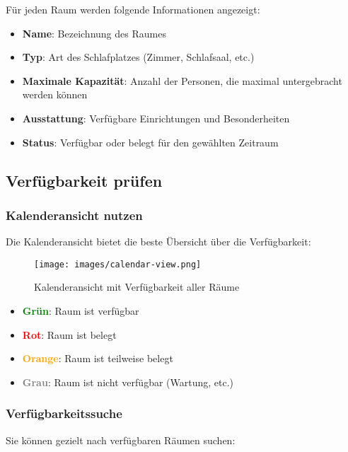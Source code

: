 Für jeden Raum werden folgende Informationen angezeigt:

\begin{itemize}
    \item \textbf{Name}: Bezeichnung des Raumes
    \item \textbf{Typ}: Art des Schlafplatzes (Zimmer, Schlafsaal, etc.)
    \item \textbf{Maximale Kapazität}: Anzahl der Personen, die maximal untergebracht werden können
    \item \textbf{Ausstattung}: Verfügbare Einrichtungen und Besonderheiten
    \item \textbf{Status}: Verfügbar oder belegt für den gewählten Zeitraum
\end{itemize}

\subsection{Verfügbarkeit prüfen}

\subsubsection{Kalenderansicht nutzen}

Die Kalenderansicht bietet die beste Übersicht über die Verfügbarkeit:

\begin{figure}[H]
    \centering
    \texttt{[image: images/calendar-view.png]}
    \caption{Kalenderansicht mit Verfügbarkeit aller Räume}
    \label{fig:calendar}
\end{figure}

\begin{itemize}
    \item \textcolor{green}{\textbf{Grün}}: Raum ist verfügbar
    \item \textcolor{red}{\textbf{Rot}}: Raum ist belegt
    \item \textcolor{orange}{\textbf{Orange}}: Raum ist teilweise belegt
    \item \textcolor{gray}{\textbf{Grau}}: Raum ist nicht verfügbar (Wartung, etc.)
\end{itemize}

\subsubsection{Verfügbarkeitssuche}

Sie können gezielt nach verfügbaren Räumen suchen:


